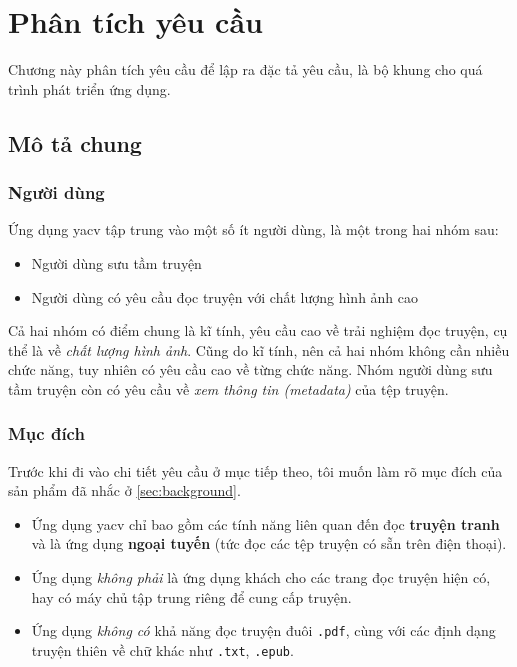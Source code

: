 \documentclass[../../thesis]{subfiles}
\begin{document}
\chapter{Phân tích yêu cầu}\label{chap:requirements}

Chương này phân tích yêu cầu để lập ra đặc tả yêu cầu, là bộ khung cho quá trình
phát triển ứng dụng.



\section{Mô tả chung}\label{sec:overview}

\subsection{Người dùng}\label{sec:users}

Ứng dụng yacv tập trung vào một số ít người dùng, là một trong hai nhóm sau:

\begin{itemize}
    \item
        Người dùng sưu tầm truyện
    \item
        Người dùng có yêu cầu đọc truyện với chất lượng hình ảnh cao
\end{itemize}

Cả hai nhóm có điểm chung là kĩ tính, yêu cầu cao về trải nghiệm đọc truyện, cụ
thể là về \emph{chất lượng hình ảnh}. Cũng do kĩ tính, nên cả hai nhóm không cần
nhiều chức năng, tuy nhiên có yêu cầu cao về từng chức năng. Nhóm người dùng sưu
tầm truyện còn có yêu cầu về \emph{xem thông tin (metadata)} của tệp truyện.

\subsection{Mục đích}\label{sec:objectives}

Trước khi đi vào chi tiết yêu cầu ở mục tiếp theo, tôi muốn làm rõ mục đích của
sản phẩm đã nhắc ở \autoref{sec:background}.

\begin{itemize}
    \item
        Ứng dụng yacv chỉ bao gồm các tính năng liên quan đến đọc \textbf{truyện
        tranh} và là ứng dụng \textbf{ngoại tuyến} (tức đọc các tệp truyện có
        sẵn trên điện thoại).
    \item
        Ứng dụng \emph{không phải} là ứng dụng khách cho các trang đọc truyện
        hiện có, hay có máy chủ tập trung riêng để cung cấp truyện.
    \item
        Ứng dụng \emph{không có} khả năng đọc truyện đuôi \texttt{.pdf}, cùng
        với các định dạng truyện thiên về chữ khác như \texttt{.txt},
        \texttt{.epub}.
\end{itemize}
\end{document}
